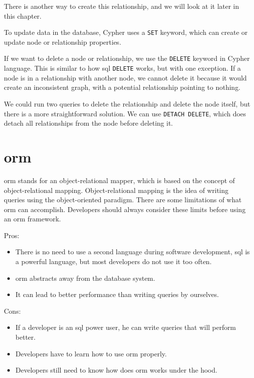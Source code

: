 
There is another way to create this relationship, and we will look at it later in this chapter.

To update data in the database, Cypher uses a \texttt{SET} keyword, which can create or update node or relationship properties.

If we want to delete a node or relationship, we use the \texttt{DELETE} keyword in Cypher language.
This is similar to how \acrshort{sql} \texttt{DELETE} works, but with one exception. If a node is in a relationship
with another node, we cannot delete it because it would create an inconsistent graph, with a potential relationship pointing to nothing. \cite{noauthor_updating_nodate}

We could run two queries to delete the relationship and delete the node itself, but there is a more straightforward solution.
We can use \texttt{DETACH DELETE}, which does detach all relationships from the node before deleting it.

\section{\acrshort{orm}}
\acrshort{orm} stands for an object-relational mapper, which is based on the concept of object-relational mapping.
Object-relational mapping is the idea of writing queries using the object-oriented paradigm.
There are some limitations of what \acrshort{orm} can accomplish. Developers should always consider these limits before using an \acrshort{orm} framework. \cite{mario_hoyos_what_2018}

\noindent Pros:
\begin{itemize}
    \item There is no need to use a second language during software development, \acrshort{sql} is a powerful language, but most developers do not use it too often.
    \item \acrshort{orm} abstracts away from the database system.
    \item It can lead to better performance than writing queries by ourselves.
\end{itemize}
Cons:
\begin{itemize}
    \item If a developer is an \acrshort{sql} power user, he can write queries that will perform better.
    \item Developers have to learn how to use \acrshort{orm} properly.
    \item Developers still need to know how does \acrshort{orm} works under the hood.
\end{itemize}

